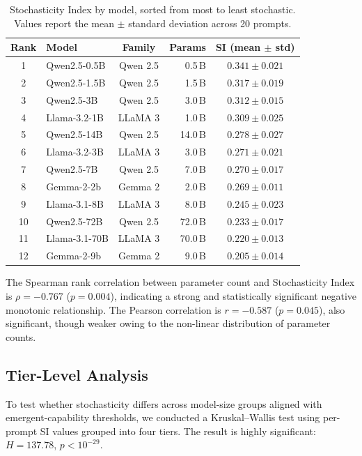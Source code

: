 \documentclass[11pt,a4paper]{article}
\begin{document}
\begin{table}[t]
\centering
\caption{Stochasticity Index by model, sorted from most to least stochastic. Values report the mean $\pm$ standard deviation across 20 prompts.}
\label{tab:ranking}
\small
\begin{tabular}{@{}clcrc@{}}
\toprule
\textbf{Rank} & \textbf{Model} & \textbf{Family} & \textbf{Params} & \textbf{SI (mean $\pm$ std)} \\
\midrule
1  & Qwen2.5-0.5B   & Qwen 2.5 &  0.5\,B & $0.341 \pm 0.021$ \\
2  & Qwen2.5-1.5B   & Qwen 2.5 &  1.5\,B & $0.317 \pm 0.019$ \\
3  & Qwen2.5-3B     & Qwen 2.5 &  3.0\,B & $0.312 \pm 0.015$ \\
4  & Llama-3.2-1B   & LLaMA 3  &  1.0\,B & $0.309 \pm 0.025$ \\
5  & Qwen2.5-14B    & Qwen 2.5 & 14.0\,B & $0.278 \pm 0.027$ \\
6  & Llama-3.2-3B   & LLaMA 3  &  3.0\,B & $0.271 \pm 0.021$ \\
7  & Qwen2.5-7B     & Qwen 2.5 &  7.0\,B & $0.270 \pm 0.017$ \\
8  & Gemma-2-2b     & Gemma 2  &  2.0\,B & $0.269 \pm 0.011$ \\
9  & Llama-3.1-8B   & LLaMA 3  &  8.0\,B & $0.245 \pm 0.023$ \\
10 & Qwen2.5-72B    & Qwen 2.5 & 72.0\,B & $0.233 \pm 0.017$ \\
11 & Llama-3.1-70B  & LLaMA 3  & 70.0\,B & $0.220 \pm 0.013$ \\
12 & Gemma-2-9b     & Gemma 2  &  9.0\,B & $0.205 \pm 0.014$ \\
\bottomrule
\end{tabular}
\end{table}

The Spearman rank correlation between parameter count and Stochasticity Index is $\rho = -0.767$ ($p = 0.004$), indicating a strong and statistically significant negative monotonic relationship.
The Pearson correlation is $r = -0.587$ ($p = 0.045$), also significant, though weaker owing to the non-linear distribution of parameter counts.

\subsection{Tier-Level Analysis}
\label{sec:tiers}

To test whether stochasticity differs across model-size groups aligned with emergent-capability thresholds, we conducted a Kruskal--Wallis test using per-prompt SI values grouped into four tiers.
The result is highly significant: $H = 137.78$, $p < 10^{-29}$.
\end{document}
